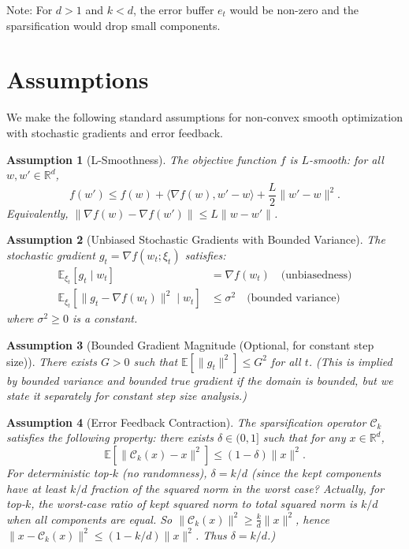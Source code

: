 \documentclass{article}
\newtheorem{assumption}{Assumption}
\begin{document}
Note: For $d>1$ and $k<d$, the error buffer $e_t$ would be non-zero and the sparsification would drop small components.

\section*{Assumptions}
We make the following standard assumptions for non-convex smooth optimization with stochastic gradients and error feedback.

\begin{assumption}[L-Smoothness]
The objective function $f$ is $L$-smooth: for all $w, w' \in \mathbb{R}^d$,
\[
f(w') \le f(w) + \langle \nabla f(w), w' - w \rangle + \frac{L}{2} \|w' - w\|^2.
\]
Equivalently, $\|\nabla f(w) - \nabla f(w')\| \le L \|w - w'\|$.
\end{assumption}

\begin{assumption}[Unbiased Stochastic Gradients with Bounded Variance]
The stochastic gradient $g_t = \nabla f(w_t; \xi_t)$ satisfies:
\begin{align}
    \mathbb{E}_{\xi_t}[g_t \mid w_t] &= \nabla f(w_t) \quad \text{(unbiasedness)} \\
    \mathbb{E}_{\xi_t}[\|g_t - \nabla f(w_t)\|^2 \mid w_t] &\le \sigma^2 \quad \text{(bounded variance)}
\end{align}
where $\sigma^2 \ge 0$ is a constant.
\end{assumption}

\begin{assumption}[Bounded Gradient Magnitude (Optional, for constant step size)]
There exists $G > 0$ such that $\mathbb{E}[\|g_t\|^2] \le G^2$ for all $t$. (This is implied by bounded variance and bounded true gradient if the domain is bounded, but we state it separately for constant step size analysis.)
\end{assumption}

\begin{assumption}[Error Feedback Contraction]
The sparsification operator $\mathcal{C}_k$ satisfies the following property: there exists $\delta \in (0,1]$ such that for any $x \in \mathbb{R}^d$,
\[
\mathbb{E}[\|\mathcal{C}_k(x) - x\|^2] \le (1-\delta) \|x\|^2.
\]
For deterministic top-$k$ (no randomness), $\delta = k/d$ (since the kept components have at least $k/d$ fraction of the squared norm in the worst case? Actually, for top-$k$, the worst-case ratio of kept squared norm to total squared norm is $k/d$ when all components are equal. So $\|\mathcal{C}_k(x)\|^2 \ge \frac{k}{d} \|x\|^2$, hence $\|x - \mathcal{C}_k(x)\|^2 \le (1 - k/d) \|x\|^2$. Thus $\delta = k/d$.)
\end{assumption}
\end{document}
